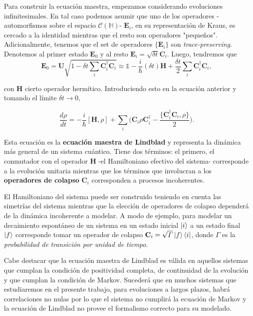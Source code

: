 \documentclass{report} %
\numberwithin{equation}{section}
\begin{document}
Para construir la ecuación maestra, empezamos considerando evoluciones infinitesimales. En tal caso podemos asumir que uno de los operadores -automorfismos sobre el espacio $\mathcal{C}(\mathds{H})$- $\mathbf{E}_i$, en su representación de Kraus, es cercado a la identidad mientras que el resto son operadores "pequeños". Adicionalmente, tenemos que el set de operadores $\{\mathbf{E}_i\}$ son \textit{trace-preserving}. Denotemos al primer estado $\mathbf{E}_0$ y al resto $\mathbf{E}_i = \sqrt{\delta t}\mathbf{C}_i$. Luego, tendremos que 
\begin{equation*}
\mathbf{E}_0 = \mathbf{U} \sqrt{1-\delta t \sum_{i} \mathbf{C}_i^{\dagger} \mathbf{C}_i} \approx \mathds{1}  - \frac{i}{\hbar} (\delta t) \mathbf{H} + \frac{\delta t}{2} \sum_{i} \mathbf{C}_i^{\dagger} \mathbf{C}_i,
\end{equation*} 

con $\mathbf{H}$ cierto operador hermítico. Introduciendo esto en la ecuación anterior y tomando el límite $\delta t \rightarrow 0$,

\begin{equation}
    \frac{d\rho}{dt} = -\frac{i}{\hbar}[\mathbf{H},\rho]+\sum_{i}\bigg(\mathbf{C}_i \rho \mathbf{C}_i^{\dagger}-\frac{\{\mathbf{C}_i^{\dagger}\mathbf{C}_i,\rho\}}{2}\bigg).
    \label{Lindblad eq.}
\end{equation}

Esta ecuación es la \textbf{ecuación maestra de Lindblad} y representa la dinámica más general de un sistema cuántico. Tiene dos términos: el primero, el conmutador con el operador $\mathbf{H}$ -el Hamiltoniano efectivo del sistema- corresponde a la evolución unitaria mientras que los términos que involucran a los \textbf{operadores de colapso} $\mathbf{C}_i$ corresponden a procesos incoherentes. 

El Hamiltoniano del sistema puede ser construido teniendo en cuenta las simetrías del sistema mientras que la elección de operadores de colapso dependerá de la dinámica incoherente a modelar. A modo de ejemplo, para modelar un decaimiento espontáneo de un sistema en un estado inicial $\ket{i}$ a un estado final $\ket{f}$ corresponde tomar un operador de colapso $\mathbf{C}_i = \sqrt{\Gamma} \ket{f}\bra{i}$, donde $\Gamma$ es la \textit{probabilidad de transición por unidad de tiempo}.

{Cabe destacar que la ecuación maestra de Lindblad es válida en aquellos sistemas que cumplan la condición de positividad completa, de continuidad de la evolución y que cumplan la condición de Markov. Sucederá que en muchos sistemas que estudiaremos en el presente trabajo, para evoluciones a largos plazos, habrá correlaciones no nulas por lo que el sistema no cumplirá la ecuación de Markov y la ecuación de Lindblad no provee el formalismo correcto para su modelado.}
\end{document}

